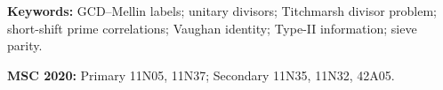 \documentclass[11pt]{article}
\theoremstyle{definition}
\theoremstyle{remark}
\begin{document}
\noindent\textbf{Keywords:} GCD--Mellin labels; unitary divisors;
Titchmarsh divisor problem; short-shift prime correlations; Vaughan
identity; Type-II information; sieve parity.

\medskip
\noindent\textbf{MSC 2020:} Primary 11N05, 11N37; Secondary
11N35, 11N32, 42A05.













\end{document}
